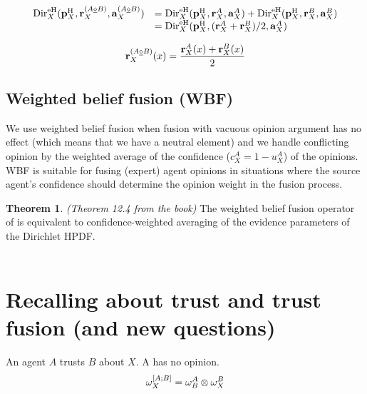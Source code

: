 \documentclass[a4paper,12pt]{article}
\theoremstyle{definition}
\theoremstyle{theorem}
\newtheorem{theorem}{Theorem}[section]
\numberwithin{equation}{section}
\begin{document}
\begin{equation}
\begin{array}{rl}
\mathrm{Dir}^{\mathrm{eH}}_X(\mathbf{p}^{\mathrm{H}}_X, \mathbf{r}^{(A \underline{\diamond} B)}_X, \mathbf{a}^{(A \underline{\diamond} B)}_X) & = \mathrm{Dir}^{\mathrm{eH}}_X(\mathbf{p}^{\mathrm{H}}_X, \mathbf{r}^{A}_X, \mathbf{a}^{A}_X) + \mathrm{Dir}^{\mathrm{eH}}_X(\mathbf{p}^{\mathrm{H}}_X, \mathbf{r}^{B}_X, \mathbf{a}^{B}_X) \\
& = \mathrm{Dir}^{\mathrm{eH}}_X(\mathbf{p}^{\mathrm{H}}_X, (\mathbf{r}^{A}_X + \mathbf{r}^{B }_X)/2, \mathbf{a}^{A}_X)
\end{array}
\end{equation}

\begin{equation}
\mathbf{r}^{(A \underline{\diamond} B)}_X(x) = \dfrac{\mathbf{r}^A_X(x) + \mathbf{r}^B_X(x)}{2}
\end{equation}

\subsection{Weighted belief fusion (WBF)}

We use weighted belief fusion when fusion with vacuous opinion argument has no effect (which means that we have a neutral element) and we handle conflicting opinion by the weighted average of the confidence ($c^A_X = 1 - u^A_X$) of the opinions. WBF is suitable for fusing (expert) agent opinions in
situations where the source agent’s confidence should determine the opinion weight
in the fusion process.

\begin{theorem}
\emph{(Theorem 12.4 from the book)}  The weighted belief fusion operator of is equivalent to confidence-weighted averaging of the evidence parameters of the Dirichlet HPDF.
\end{theorem}

\begin{equation}
\begin{array}{rl}

\end{array}
\end{equation}


\section{Recalling about trust and trust fusion (and new questions)}

An agent $A$ trusts $B$ about $X$. A has no opinion.
\begin{equation}
\omega^{[A; B]}_{X} = \omega^{A}_{B} \otimes \omega^{B}_{X}
\end{equation}
\end{document}
